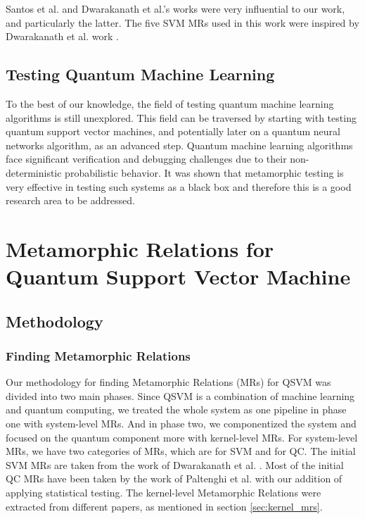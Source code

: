 \documentclass[12pt,a4paper]{article}
\begin{document}
	Santos et al. \cite{ssantos2020} and Dwarakanath et al.'s \cite{Dwarakanath2018} works were very influential to our work, and particularly the latter. The five SVM MRs used in this work were inspired by Dwarakanath et al. work \cite{Dwarakanath2018}.
	
	\subsection{Testing Quantum Machine Learning}
	
	To the best of our knowledge, the field of testing quantum machine learning algorithms is still unexplored. This field can be traversed by starting with testing quantum support vector machines, and potentially later on a quantum neural networks algorithm, as an advanced step. Quantum machine learning algorithms face significant verification and debugging challenges due to their non-deterministic probabilistic behavior. It was shown that metamorphic testing is very effective in testing such systems as a black box and therefore this is a good research area to be addressed.
	
	
	\section{Metamorphic Relations for Quantum Support Vector Machine}
	\label{sec:Metamorphic_Relations_for_Quantum_Support_Vector_Machine}
	
	\subsection{Methodology}
	
	\subsubsection{Finding Metamorphic Relations}
	
	Our methodology for finding Metamorphic Relations (MRs) for QSVM was divided into two main phases. Since QSVM is a combination of machine learning and quantum computing, we treated the whole system as one pipeline in phase one with system-level MRs. And in phase two, we componentized the system and focused on the quantum component more with kernel-level MRs. For system-level MRs, we have two categories of MRs, which are for SVM and for QC. The initial SVM MRs are taken from the work of Dwarakanath et al. \cite{Dwarakanath2018}. Most of the initial QC MRs have been taken by the work of Paltenghi et al. \cite{Paltenghi2023} with our addition of applying statistical testing. The kernel-level Metamorphic Relations were extracted from different papers, as mentioned in section \ref{sec:kernel_mrs}.
	
\end{document}
